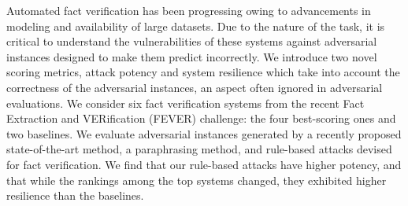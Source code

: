 Automated fact verification has been progressing owing to advancements in modeling and availability of large datasets. Due to the nature of the task, it is critical to understand the vulnerabilities of these systems against adversarial instances designed to make them predict incorrectly. We introduce two novel scoring metrics, attack potency and system resilience which take into account the correctness of the adversarial instances, an aspect often ignored in adversarial evaluations. We consider six fact verification systems from the recent Fact Extraction and VERification (FEVER) challenge: the four best-scoring ones and two baselines. We evaluate adversarial instances generated by a recently proposed state-of-the-art method, a paraphrasing method, and rule-based attacks devised for fact verification. We find that our rule-based attacks have higher potency, and that while the rankings among the top systems changed, they exhibited higher resilience than the baselines.
